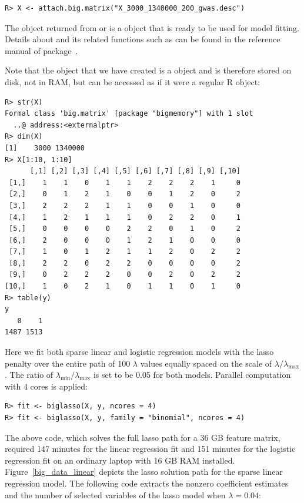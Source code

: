 \begin{verbatim}
R> X <- attach.big.matrix("X_3000_1340000_200_gwas.desc")
\end{verbatim}

The object  returned from  or  is a  object that is ready to be used for model fitting. Details about  and its related functions such as  can be found in the reference manual of  package~\citep{kane2013scalable}.

Note that the object  that we have created is a  object and is therefore stored on disk, not in RAM, but can be accessed as if it were a regular R object:
\begin{verbatim}
R> str(X)
Formal class 'big.matrix' [package "bigmemory"] with 1 slot
  ..@ address:<externalptr> 
R> dim(X)
[1]    3000 1340000
R> X[1:10, 1:10]
      [,1] [,2] [,3] [,4] [,5] [,6] [,7] [,8] [,9] [,10]
 [1,]    1    1    0    1    1    2    2    2    1     0
 [2,]    0    1    2    1    0    0    1    2    0     2
 [3,]    2    2    2    1    1    0    0    1    0     0
 [4,]    1    2    1    1    1    0    2    2    0     1
 [5,]    0    0    0    0    2    2    0    1    0     2
 [6,]    2    0    0    0    1    2    1    0    0     0
 [7,]    1    0    1    2    1    1    2    0    2     2
 [8,]    2    2    0    2    2    0    0    0    0     2
 [9,]    0    2    2    2    0    0    2    0    2     2
[10,]    1    0    2    1    0    1    1    0    1     0
R> table(y)
y
   0    1 
1487 1513 
\end{verbatim}

Here we fit both sparse linear and logistic regression models with the lasso penalty over the entire path of 100 $\lambda$ values equally spaced on the scale of $\lambda / \lambda_{\max}$. The ratio of $\lambda_{\min} / \lambda_{\max}$ is set to be 0.05 for both models. Parallel computation with 4 cores is applied:

\begin{verbatim}
R> fit <- biglasso(X, y, ncores = 4)
R> fit <- biglasso(X, y, family = "binomial", ncores = 4)
\end{verbatim}

The above code, which solves the full lasso path for a 36 GB feature matrix, required 147 minutes for the linear regression fit and 151 minutes for the logistic regression fit on an ordinary laptop with 16 GB RAM installed.  Figure~\ref{big_data_linear} depicts the lasso solution path for the sparse linear regression model. The following code extracts the nonzero coefficient estimates and the number of selected variables of the lasso model when $\lambda = 0.04$:

